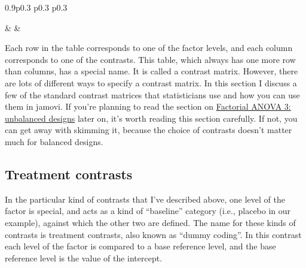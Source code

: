 \documentclass[
  a4paper,
]{book}
\begin{document}
\begin{table}[ht]
\begin{centerbox}
\begin{threeparttable}
\begin{tabularx}{0.9\textwidth}{p{} p{} p{}}
\hhline{}

 &
 &
 \tabularnewline[-0.5pt]


\end{tabularx} 

\end{threeparttable}\par\end{centerbox}

\end{table}
 

Each row in the table corresponds to one of the factor levels, and each
column corresponds to one of the contrasts. This table, which always has
one more row than columns, has a special name. It is called a contrast
matrix. However, there are lots of different ways to specify a contrast
matrix. In this section I discuss a few of the standard contrast
matrices that statisticians use and how you can use them in jamovi. If
you're planning to read the section on
\protect\hyperlink{factorial-anova-3-unbalanced-designs}{Factorial ANOVA
3: unbalanced designs} later on, it's worth reading this section
carefully. If not, you can get away with skimming it, because the choice
of contrasts doesn't matter much for balanced designs.

\hypertarget{treatment-contrasts}{%
\subsection{Treatment contrasts}\label{treatment-contrasts}}

In the particular kind of contrasts that I've described above, one level
of the factor is special, and acts as a kind of ``baseline'' category
(i.e., placebo in our example), against which the other two are defined.
The name for these kinds of contrasts is treatment contrasts, also known
as ``dummy coding''. In this contrast each level of the factor is
compared to a base reference level, and the base reference level is the
value of the intercept.
\end{document}
